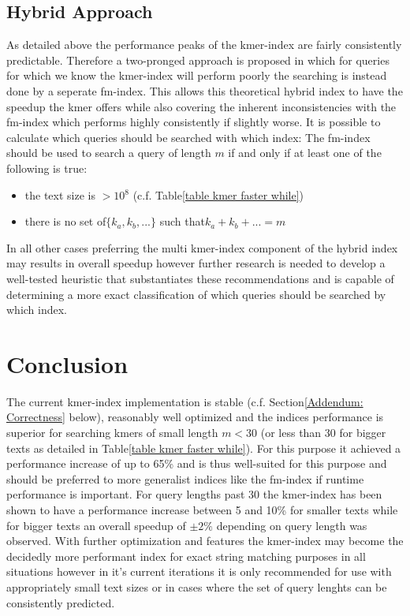 \section{Hybrid Approach}
As detailed above the performance peaks of the kmer-index are fairly
consistently predictable. Therefore a two-pronged approach is proposed in which
for queries for which we know the kmer-index will perform poorly the
searching is instead done by a seperate fm-index. This allows this theoretical hybrid index
to have the speedup the kmer offers while also covering the inherent inconsistencies with the fm-index
which performs highly consistently if slightly worse. It is possible to calculate
which queries should be searched with which index: The fm-index should be used to
search a query of length $m$ if and only if at least one of the following is true:
\begin{itemize}
\item the text size is $>10{{}^8}$ (c.f. Table\ref{table kmer faster while})
\item there is no set of$\{k_{a},k_{b},...\}$ such that$k_{a}+k_{b}+...=m$
\end{itemize}
In all other cases preferring the multi kmer-index component of the hybrid index
may results in overall speedup however further research is needed to develop a well-tested
heuristic that substantiates these recommendations and is capable of determining a more
exact classification of which queries should be searched by which index.

\chapter{Conclusion}

The current kmer-index implementation is stable (c.f. Section\ref{Addendum: Correctness}
below), reasonably well optimized and the indices performance is superior
for searching kmers of small length $m<30$ (or less than
30 for bigger texts as detailed in Table\ref{table kmer faster while}).
For this purpose it achieved a performance increase of up to 65\%
and is thus well-suited for this purpose and should be preferred to more generalist
indices like the fm-index if runtime performance is important. For
query lengths past 30 the kmer-index has been shown to have a performance
increase between 5 and 10\% for smaller texts
while for bigger texts an overall speedup of $\pm2\%$ depending
on query length was observed. With further optimization and features
the kmer-index may become the decidedly more performant index for
exact string matching purposes in all situations however in it's current
iterations it is only recommended for use with appropriately small
text sizes or in cases where the set of query lenghts can be consistently predicted.


